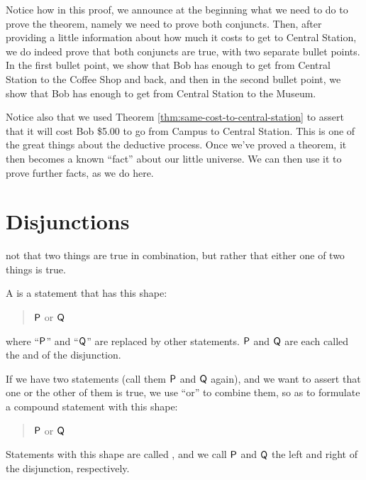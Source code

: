 \documentclass[../../../main.tex]{subfiles}
\begin{document}
Notice how in this proof, we announce at the beginning what we need to do to prove the theorem, namely we need to prove both conjuncts. Then, after providing a little information about how much it costs to get to Central Station, we do indeed prove that both conjuncts are true, with two separate bullet points. In the first bullet point, we show that Bob has enough to get from Central Station to the Coffee Shop and back, and then in the second bullet point, we show that Bob has enough to get from Central Station to the Museum.

Notice also that we used Theorem \ref{thm:same-cost-to-central-station} to assert that it will cost Bob \$5.00 to go from Campus to Central Station. This is one of the great things about the deductive process. Once we've proved a theorem, it then becomes a known ``fact'' about our little universe. We can then use it to prove further facts, as we do here.


\section{Disjunctions}

 not that two things are true in combination, but rather that either one of two things is true.

\begin{terminology}
  A  is a statement that has this shape:
    
  \begin{quote}
    $\P/$ or $\Q/$
  \end{quote}
    
  \noindent
  where ``$\P/$'' and ``$\Q/$'' are replaced by other statements. $\P/$ and $\Q/$ are each called the  and  of the disjunction.
\end{terminology}

If we have two statements (call them $\P/$ and $\Q/$ again), and we want to assert that one or the other of them is true, we use ``or'' to combine them, so as to formulate a compound statement with this shape:

\begin{quote}
  $\P/$ or $\Q/$
\end{quote}

\noindent
Statements with this shape are called , and we call $\P/$ and $\Q/$ the left and right  of the disjunction, respectively.
\end{document}
